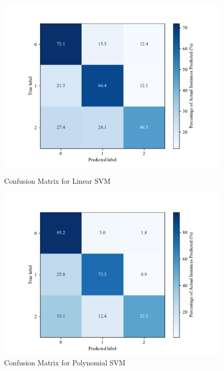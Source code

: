     \begin{figure}[htbp]
        \centering
        \begin{minipage}[b]{0.40\textwidth}
          \centering
          \includegraphics[width=\textwidth]{images/confusion_matrix_linear_svm.pdf}
          \caption{Confusion Matrix for Linear SVM}
          \label{fig:confusion_linear}
        \end{minipage}
        \hfill
        \begin{minipage}[b]{0.45\textwidth}
          \centering
          \includegraphics[width=\textwidth]{images/confusion_matrix_poly_svm.pdf}
          \caption{Confusion Matrix for Polynomial SVM}
          \label{fig:confusion_poly}
        \end{minipage}
        \end{figure}
        
